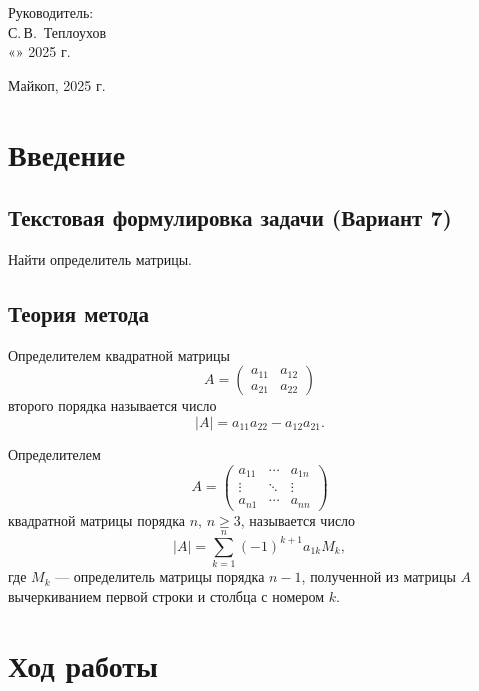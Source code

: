 \documentclass[12pt,a4paper]{scrartcl}
\begin{document}
\begin{titlepage}
		\hfill\begin{minipage}{0.5\textwidth}
			Руководитель:\\
			\underline{\hspace{\ML}} С.\,В.~Теплоухов\\
			«\underline{\hspace{0.7cm}}» \underline{\hspace{2cm}} 2025 г.
		\end{minipage}%
		\vfill
		
		\begin{center}
			Майкоп, 2025 г.
		\end{center}
	\end{titlepage}

    \section{Введение}
\label{sec:intro}
\subsection{Текстовая формулировка задачи (Вариант 7)}
Найти определитель матрицы.

\subsection{Теория метода}

Определителем квадратной матрицы 
\[
A = \begin{pmatrix}
a_{11} & a_{12} \\
a_{21} & a_{22}
\end{pmatrix}
\]
второго порядка называется число
\[
|A| = a_{11}a_{22} - a_{12}a_{21}.
\]

Определителем 
\[
A = \begin{pmatrix}
a_{11} & \cdots & a_{1n} \\
\vdots & \ddots & \vdots \\
a_{n1} & \cdots & a_{nn}
\end{pmatrix}
\]
квадратной матрицы порядка \( n,\, n \geq 3 \), называется число
\[
|A| = \sum_{k=1}^{n} (-1)^{k+1} a_{1k} M_k,
\]
где \( M_k \) — определитель матрицы порядка \( n-1 \), полученной из матрицы \( A \) вычеркиванием первой строки и столбца с номером \( k \).

\section{Ход работы}
\label{sec:exp}
\end{document}
